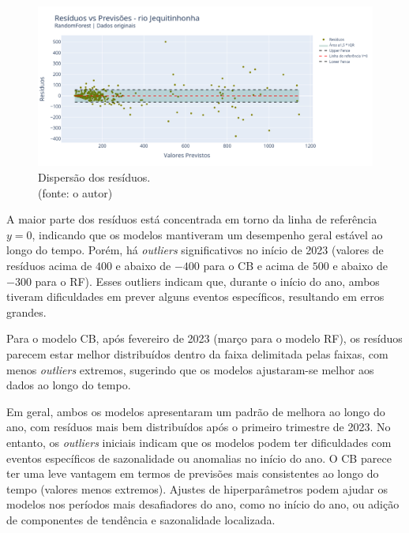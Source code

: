 \begin{figure}[!h]
\centering
\includegraphics[scale=0.33]{Figuras/jequiti/wfv/RF/RF_WFV_ORIG_RESID_x_PREV.png}
\caption{Dispersão dos resíduos.\\(fonte: o autor)}
\label{fig:jequiti_RF_WFV_ORIG_RESID_x_PREV}
\end{figure}
\clearpage

A maior parte dos resíduos está concentrada em torno da linha de referência $y=0$, indicando que os modelos mantiveram um desempenho geral estável ao longo do tempo. Porém, há \textit{outliers} significativos no início de 2023 (valores de resíduos acima de $400$ e abaixo de $-400$ para o CB e acima de $500$ e abaixo de $-300$ para o RF). Esses outliers indicam que, durante o início do ano, ambos tiveram dificuldades em prever alguns eventos específicos, resultando em erros grandes.

Para o modelo CB, após fevereiro de 2023 (março para o modelo RF), os resíduos parecem estar melhor distribuídos dentro da faixa delimitada pelas faixas, com menos \textit{outliers} extremos, sugerindo que os modelos ajustaram-se melhor aos dados ao longo do tempo.

Em geral, ambos os modelos apresentaram um padrão de melhora ao longo do ano, com resíduos mais bem distribuídos após o primeiro trimestre de 2023. No entanto, os \textit{outliers} iniciais indicam que os modelos podem ter dificuldades com eventos específicos de sazonalidade ou anomalias no início do ano. O CB parece ter uma leve vantagem em termos de previsões mais consistentes ao longo do tempo (valores menos extremos). Ajustes de hiperparâmetros podem ajudar os modelos nos períodos mais desafiadores do ano, como no início do ano, ou adição de componentes de tendência e sazonalidade localizada.

